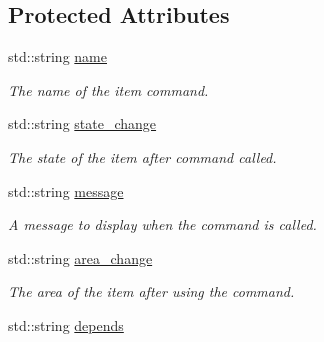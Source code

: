 \subsection*{\-Protected \-Attributes}
\begin{DoxyCompactItemize}
\item 
\hypertarget{class_item_command_ae79c7cdf02b170b78bc5967a334cdcf7}{
std\-::string \hyperlink{class_item_command_ae79c7cdf02b170b78bc5967a334cdcf7}{name}}
\label{class_item_command_ae79c7cdf02b170b78bc5967a334cdcf7}

\begin{DoxyCompactList}\small\item\em \-The name of the item command. \end{DoxyCompactList}\item 
\hypertarget{class_item_command_a7aa339b7c9c54ca6d331b9729cf8c044}{
std\-::string \hyperlink{class_item_command_a7aa339b7c9c54ca6d331b9729cf8c044}{state\-\_\-change}}
\label{class_item_command_a7aa339b7c9c54ca6d331b9729cf8c044}

\begin{DoxyCompactList}\small\item\em \-The state of the item after command called. \end{DoxyCompactList}\item 
\hypertarget{class_item_command_a553f91c8eae8f25ba27ed0eb875e5e19}{
std\-::string \hyperlink{class_item_command_a553f91c8eae8f25ba27ed0eb875e5e19}{message}}
\label{class_item_command_a553f91c8eae8f25ba27ed0eb875e5e19}

\begin{DoxyCompactList}\small\item\em \-A message to display when the command is called. \end{DoxyCompactList}\item 
\hypertarget{class_item_command_ac5fe64207c12fbd50c3a8b92207acb40}{
std\-::string \hyperlink{class_item_command_ac5fe64207c12fbd50c3a8b92207acb40}{area\-\_\-change}}
\label{class_item_command_ac5fe64207c12fbd50c3a8b92207acb40}

\begin{DoxyCompactList}\small\item\em \-The area of the item after using the command. \end{DoxyCompactList}\item 
\hypertarget{class_item_command_a6da1ba48131d1f2c414ad4728e7bb4c2}{
std\-::string \hyperlink{class_item_command_a6da1ba48131d1f2c414ad4728e7bb4c2}{depends}}
\label{class_item_command_a6da1ba48131d1f2c414ad4728e7bb4c2}


\end{DoxyCompactItemize}
